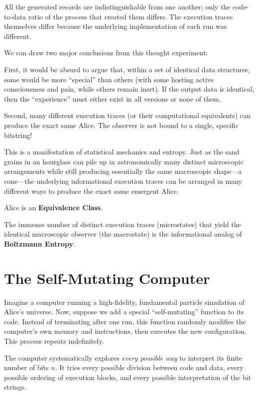 All the generated records are indistinguishable from one another; only the code-to-data ratio of the process that created them differs. 
The execution traces themselves differ because the underlying implementation of each run was different.

We can draw two major conclusions from this thought experiment:

First, it would be absurd to argue that, within a set of identical data structures, some would be more ``special'' than others (with some hosting active consciousness and pain, while others remain inert). 
If the output data is identical, then the ``experience'' must either exist in all versions or none of them.

Second, many different execution traces (or their computational equivalents) can produce the exact same Alice. 
The observer is not bound to a single, specific bitstring!

This is a manifestation of statistical mechanics and entropy. 
Just as the sand grains in an hourglass can pile up in astronomically many distinct microscopic arrangements while still producing essentially the same macroscopic shape---a cone---the underlying informational execution traces can be arranged in many different ways to produce the exact same emergent Alice.

Alice is an \textbf{Equivalence Class}.

The immense number of distinct execution traces (microstates) that yield the identical macroscopic observer (the macrostate) is the informational analog of \textbf{Boltzmann Entropy}.


\section{The Self-Mutating Computer}

Imagine a computer running a high-fidelity, fundamental particle simulation of Alice's universe. 
Now, suppose we add a special ``self-mutating'' function to its code. 
Instead of terminating after one run, this function randomly modifies the computer's own memory and instructions, then executes the new configuration. This process repeats indefinitely.

The computer systematically explores \emph{every possible way} to interpret its finite number of bits $n$. 
It tries every possible division between code and data, every possible ordering of execution blocks, and every possible interpretation of the bit strings. 


